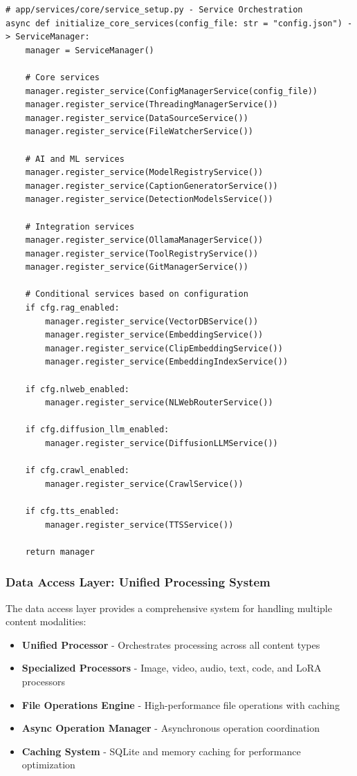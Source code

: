 \documentclass[11pt]{article}
\begin{document}
\begin{lstlisting}[style=python]
# app/services/core/service_setup.py - Service Orchestration
async def initialize_core_services(config_file: str = "config.json") -> ServiceManager:
    manager = ServiceManager()
    
    # Core services
    manager.register_service(ConfigManagerService(config_file))
    manager.register_service(ThreadingManagerService())
    manager.register_service(DataSourceService())
    manager.register_service(FileWatcherService())
    
    # AI and ML services
    manager.register_service(ModelRegistryService())
    manager.register_service(CaptionGeneratorService())
    manager.register_service(DetectionModelsService())
    
    # Integration services
    manager.register_service(OllamaManagerService())
    manager.register_service(ToolRegistryService())
    manager.register_service(GitManagerService())
    
    # Conditional services based on configuration
    if cfg.rag_enabled:
        manager.register_service(VectorDBService())
        manager.register_service(EmbeddingService())
        manager.register_service(ClipEmbeddingService())
        manager.register_service(EmbeddingIndexService())
    
    if cfg.nlweb_enabled:
        manager.register_service(NLWebRouterService())
    
    if cfg.diffusion_llm_enabled:
        manager.register_service(DiffusionLLMService())
    
    if cfg.crawl_enabled:
        manager.register_service(CrawlService())
    
    if cfg.tts_enabled:
        manager.register_service(TTSService())
    
    return manager
\end{lstlisting}

\subsubsection{Data Access Layer: Unified Processing System}

The data access layer provides a comprehensive system for handling multiple content modalities:

\begin{itemize}
\item \textbf{Unified Processor} - Orchestrates processing across all content types
\item \textbf{Specialized Processors} - Image, video, audio, text, code, and LoRA processors
\item \textbf{File Operations Engine} - High-performance file operations with caching
\item \textbf{Async Operation Manager} - Asynchronous operation coordination
\item \textbf{Caching System} - SQLite and memory caching for performance optimization
\end{itemize}
\end{document}
